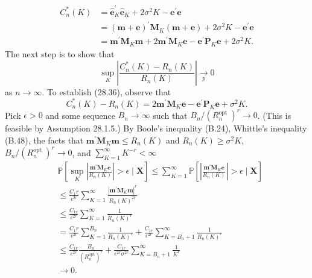 \documentclass[10pt]{article}
\begin{document}
$$
\begin{aligned}
C_{n}^{*}(K) &=\widehat{\boldsymbol{e}}_{K}^{\prime} \widehat{\boldsymbol{e}}_{K}+2 \sigma^{2} K-\boldsymbol{e}^{\prime} \boldsymbol{e} \\
&=(\boldsymbol{m}+\boldsymbol{e})^{\prime} \boldsymbol{M}_{K}(\boldsymbol{m}+\boldsymbol{e})+2 \sigma^{2} K-\boldsymbol{e}^{\prime} \boldsymbol{e} \\
&=\boldsymbol{m}^{\prime} \boldsymbol{M}_{K} \boldsymbol{m}+2 \boldsymbol{m}^{\prime} \boldsymbol{M}_{K} \boldsymbol{e}-\boldsymbol{e}^{\prime} \boldsymbol{P}_{K} \boldsymbol{e}+2 \sigma^{2} K .
\end{aligned}
$$
The next step is to show that
$$
\sup _{K}\left|\frac{C_{n}^{*}(K)-R_{n}(K)}{R_{n}(K)}\right| \underset{p}{\longrightarrow} 0
$$
as $n \rightarrow \infty$. To establish (28.36), observe that
$$
C_{n}^{*}(K)-R_{n}(K)=2 \boldsymbol{m}^{\prime} \boldsymbol{M}_{K} \boldsymbol{e}-\boldsymbol{e}^{\prime} \boldsymbol{P}_{K} \boldsymbol{e}+\sigma^{2} K .
$$
Pick $\epsilon>0$ and some sequence $B_{n} \rightarrow \infty$ such that $B_{n} /\left(R_{n}^{\text {opt }}\right)^{r} \rightarrow 0$. (This is feasible by Assumption 28.1.5.) By Boole's inequality (B.24), Whittle's inequality (B.48), the facts that $\boldsymbol{m}^{\prime} \boldsymbol{M}_{K} \boldsymbol{m} \leq R_{n}(K)$ and $R_{n}(K) \geq \sigma^{2} K$, $B_{n} /\left(R_{n}^{\text {opt }}\right)^{r} \rightarrow 0$, and $\sum_{K=1}^{\infty} K^{-r}<\infty$
$$
\begin{aligned}
& \mathbb{P}\left[\sup _{K}\left|\frac{\boldsymbol{m}^{\prime} \boldsymbol{M}_{K} \boldsymbol{e}}{R_{n}(K)}\right|>\epsilon \mid \boldsymbol{X}\right] \leq \sum_{K=1}^{\infty} \mathbb{P}\left[\left|\frac{\boldsymbol{m}^{\prime} \boldsymbol{M}_{K} \boldsymbol{e}}{R_{n}(K)}\right|>\epsilon \mid \boldsymbol{X}\right] \\
& \leq \frac{C_{1} r}{\epsilon^{2 r}} \sum_{K=1}^{\infty} \frac{\left|\boldsymbol{m}^{\prime} \boldsymbol{M}_{K} \boldsymbol{m}\right|^{r}}{R_{n}(K)^{2 r}} \\
& \leq \frac{C_{1 r}}{\epsilon^{2 r}} \sum_{K=1}^{\infty} \frac{1}{R_{n}(K)^{r}} \\
& =\frac{C_{1} r}{\epsilon^{2 r}} \sum_{K=1}^{B_{n}} \frac{1}{R_{n}(K)^{r}}+\frac{C_{1 r}}{\epsilon^{2 r}} \sum_{K=B_{n}+1}^{\infty} \frac{1}{R_{n}(K)^{r}} \\
& \leq \frac{C_{1 r}}{\epsilon^{2 r}} \frac{B_{n}}{\left(R_{n}^{\mathrm{opt}}\right)^{r}}+\frac{C_{1 r}}{\epsilon^{2 r} \sigma^{2 r}} \sum_{K=B_{n}+1}^{\infty} \frac{1}{K^{r}} \\
& \rightarrow 0 \text {. }
\end{aligned}
$$
\end{document}
